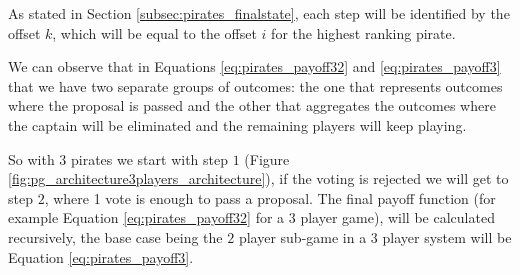 As stated in Section \ref{subsec:pirates_finalstate}, each step will be identified by the offset $k$, which will be equal to the offset $i$ for the highest ranking pirate. 

We can observe that in Equations \ref{eq:pirates_payoff32} and \ref{eq:pirates_payoff3} that we have two separate groups of outcomes: the one that represents outcomes where the proposal is passed and the other that aggregates the outcomes where the captain will be eliminated and the remaining players will keep playing.

So with $3$ pirates we start with step $1$ (Figure \ref{fig:pg_architecture3players_architecture}), if the voting is rejected we will get to step $2$, where 1 vote is enough to pass a proposal. The final payoff function (for example Equation \ref{eq:pirates_payoff32} for a $3$ player game), will be calculated recursively, the base case being the $2$ player sub-game in a $3$ player system will be Equation \ref{eq:pirates_payoff3}.

 

